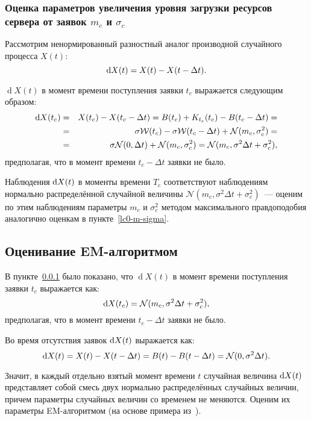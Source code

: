 \documentclass[a4paper,10pt]{article}
\begin{document}
\subsubsection{Оценка параметров увеличения уровня загрузки ресурсов сервера %
от заявок $m_c$ и $\sigma_c$}%
\label{lc0-mc-sigmac}
Рассмотрим ненормированный разностный аналог производной 
случайного процесса $X(t)$:
$$\dif X(t) = X(t) - X(t - \Delta t).$$

$\operatorname{d}X(t)$ в момент времени поступления заявки $t_c$ 
выражается следующим образом:
\begin{eqnarray*}
\dif X(t_c) 
  & = & X(t_c) - X(t_c - \Delta t) = 
      B(t_c) + K_{t_c}(t_c) - B(t_c - \Delta t) = \\
  & = & \sigma \mathcal{W}(t_c) - \sigma \mathcal{W}(t_c - \Delta t) + 
      \mathcal{N}(m_c, \sigma_c^2) = \\
  & = & \sigma \mathcal{N}(0, \Delta t) + \mathcal{N}(m_c, \sigma_c^2) =
      \mathcal{N}(m_c, \sigma^2 \Delta t + \sigma_c^2),
\end{eqnarray*}
предполагая, что в момент времени $t_c - \Delta t$ заявки не было.

Наблюдения $\dif X(t)$ в моменты времени $T_c$ соответствуют наблюдениям 
нормально распределённой случайной величины 
$\mathcal{N}(m_c, \sigma^2 \Delta t + \sigma_c^2)$~--- 
оценим по этим наблюдениям параметры $m_c$ и $\sigma_c^2$ 
методом максимального правдоподобия аналогично оценкам в 
пункте~\ref{lc0-m-sigma}.

\subsection{Оценивание EM-алгоритмом}%
\label{EM}
В пункте~\ref{lc0-mc-sigmac} было показано, 
что $\operatorname{d}X(t)$ в момент времени поступления заявки $t_c$ 
выражается как:
$$
  \dif X(t_c) = \mathcal{N}(m_c, \sigma^2 \Delta t + \sigma_c^2),
$$
предполагая, что в момент времени $t_c - \Delta t$ заявки не было.

Во время отсутствия заявок $\dif X(t)$ выражается как:
$$
\dif X(t) = X(t) - X(t - \Delta t) = 
    B(t) - B(t - \Delta t) =
    \mathcal{N}(0, \sigma^2 \Delta t).
$$

Значит, в каждый отдельно взятый момент времени $t$ 
случайная величина $\dif X(t)$ представляет собой смесь двух нормально 
распределённых случайных величин, 
причем параметры случайных величин со временем не меняются.
Оценим их параметры EM-алгоритмом 
(на основе примера из~\cite{wiki:em-algorithm}).
\end{document}
